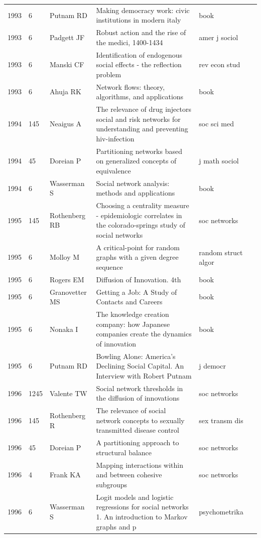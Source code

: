 \documentclass[11pt]{article} %
\begin{document}
\begin{landscape}
\begin{longtable}{p{0.7cm}|p{0.8cm}|p{3cm}|p{14.5cm}|p{3.5cm}l}
1993& 	6& 	 Putnam RD& 	 Making democracy work: civic institutions in modern italy & 	 book\\
1993& 	6& 	 Padgett JF& 	 Robust action and the rise of the medici, 1400-1434& 	 amer j sociol\\
1993& 	6& 	 Manski CF& 	 Identification of endogenous social effects - the reflection problem& 	 rev econ stud\\
1993& 	6& 	 Ahuja RK& 	 Network flows: theory, algorithms, and applications & 	 book\\
1994& 	145& 	 Neaigus A& 	 The relevance of drug injectors social and risk networks for understanding and preventing hiv-infection& 	 soc sci med\\
1994& 	45& 	 Doreian P& 	 Partitioning networks based on generalized concepts of equivalence& 	 j math sociol\\
1994& 	6& 	 Wasserman S & 	 Social network analysis: methods and applications& 	 book\\
1995& 	145& 	 Rothenberg RB& 	 Choosing a centrality measure - epidemiologic correlates in the colorado-springs study of social networks& 	 soc networks\\
1995& 	6& 	 Molloy M& 	 A critical-point for random graphs with a given degree sequence& 	 random struct algor\\
1995& 	6& 	 Rogers EM& 	 Diffusion of Innovation. 4th& 	 book\\
1995& 	6& 	 Granovetter MS& 	 Getting a Job: A Study of Contacts and Careers& 	 book\\
1995& 	6& 	 Nonaka I& 	 The knowledge creation company: how Japanese companies create the dynamics of innovation& 	 book\\
1995& 	6& 	 Putnam RD& 	 Bowling Alone: America's Declining Social Capital. An Interview with Robert Putnam& 	 j democr\\
1996& 	1245& 	 Valente TW& 	 Social network thresholds in the diffusion of innovations& 	 soc networks\\
1996& 	145& 	 Rothenberg R& 	 The relevance of social network concepts to sexually transmitted disease control& 	 sex transm dis\\
1996& 	45& 	 Doreian P& 	 A partitioning approach to structural balance& 	 soc networks\\
1996& 	4& 	 Frank KA& 	 Mapping interactions within and between cohesive subgroups& 	 soc networks\\
1996& 	6& 	 Wasserman S& 	 Logit models and logistic regressions for social networks 1. An introduction to Markov graphs and p& 	 psychometrika\\

\end{longtable}
\end{landscape}
\end{document}
